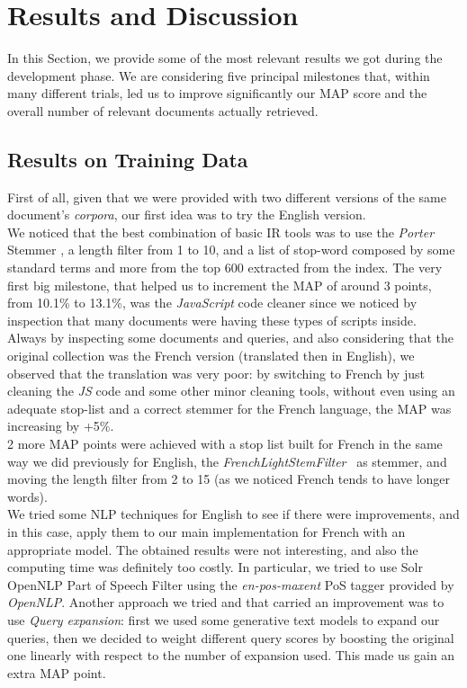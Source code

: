 
\section{Results and Discussion}

\label{sec:results}


In this Section, we provide some of the most relevant results we got during the development phase.
We are considering five principal milestones that, within many different trials, led us to improve significantly our \ac{MAP} score and the overall number of relevant documents actually retrieved.
\subsection{Results on Training Data}
First of all, given that we were provided with two different versions of the same document's \textit{corpora}, our first idea was to try the English version.\\
We noticed that the best combination of basic \ac{IR} tools was to use the \textit{Porter} Stemmer \cite{solrporterstemfilter}, a length filter from 1 to 10, and a list of stop-word composed by some standard terms and more from the top 600 extracted from the index.
The very first big milestone, that helped us to increment the \ac{MAP} of around 3 points, from 10.1\% to 13.1\%, was the \textit{JavaScript} code cleaner since we noticed by inspection that many documents were having these types of scripts inside.\\
Always by inspecting some documents and queries, and also considering that the original collection was the French version (translated then in English), we observed that the translation was very poor: by switching to French
by just cleaning the \textit{JS} code and some other minor cleaning tools, without even using an adequate stop-list and a correct stemmer for the French language, the \ac{MAP} was increasing by +5\%. \\
2 more \ac{MAP} points were achieved with a stop list built for French in the same way we did previously for English, the \textit{FrenchLightStemFilter}~\cite{solrfrenchlightstemfilter} as stemmer, and moving the length filter from 2 to 15 (as we noticed French tends to have longer words). \\
We tried some \ac{NLP} techniques for English to see if there were improvements, and in this case, apply them to our main implementation for French with an appropriate model. The obtained results were not interesting, and also the computing time was definitely too costly. In particular, we tried to use Solr OpenNLP Part of Speech Filter \cite{solropennlpposfilter} using the \textit{en-pos-maxent} \ac{PoS} tagger provided by \textit{OpenNLP}.
Another approach we tried and that carried an improvement was to use \textit{Query expansion}: first we used some generative text models to expand our queries, then we decided to weight different query scores by boosting the original one linearly with respect to the number
of expansion used. This made us gain an extra \ac{MAP} point.



